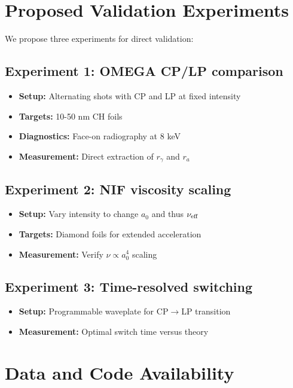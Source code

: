 \documentclass[aps,pre,twocolumn,showpacs,superscriptaddress]{revtex4-2}
\theoremstyle{definition}
\begin{document}
\section{Proposed Validation Experiments}\label{sec:proposed}

We propose three experiments for direct validation:

\subsection{Experiment 1: OMEGA CP/LP comparison}
\begin{itemize}
\item \textbf{Setup:} Alternating shots with CP and LP at fixed intensity
\item \textbf{Targets:} 10-50 nm CH foils
\item \textbf{Diagnostics:} Face-on radiography at 8 keV
\item \textbf{Measurement:} Direct extraction of $r_\gamma$ and $r_a$
\end{itemize}

\subsection{Experiment 2: NIF viscosity scaling}
\begin{itemize}
\item \textbf{Setup:} Vary intensity to change $a_0$ and thus $\nu_{\rm eff}$
\item \textbf{Targets:} Diamond foils for extended acceleration
\item \textbf{Measurement:} Verify $\nu \propto a_0^4$ scaling
\end{itemize}

\subsection{Experiment 3: Time-resolved switching}
\begin{itemize}
\item \textbf{Setup:} Programmable waveplate for CP$\to$LP transition
\item \textbf{Measurement:} Optimal switch time versus theory
\end{itemize}

\section{Data and Code Availability}\label{sec:data}
\end{document}
